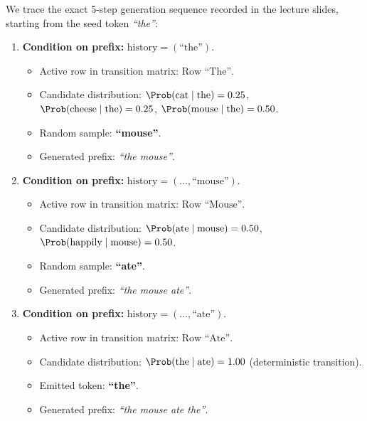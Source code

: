 \documentclass[../../main.tex]{subfiles}
\begin{document}
We trace the exact 5-step generation sequence recorded in the lecture slides, starting from the seed token \textit{``the''}:

\begin{enumerate}[label=\textbf{Step \arabic*:}, leftmargin=2.0cm]
    \item \textbf{Condition on prefix:} $\text{history} = (\text{``the''})$.
    \begin{itemize}
        \item Active row in transition matrix: $\text{Row ``The''}$.
        \item Candidate distribution: $\Prob(\text{cat}\mid\text{the}) = 0.25$, $\Prob(\text{cheese}\mid\text{the}) = 0.25$, $\Prob(\text{mouse}\mid\text{the}) = 0.50$.
        \item Random sample: \textbf{``mouse''}.
        \item Generated prefix: \textit{``the mouse''}.
    \end{itemize}

    \item \textbf{Condition on prefix:} $\text{history} = (\dots, \text{``mouse''})$.
    \begin{itemize}
        \item Active row in transition matrix: $\text{Row ``Mouse''}$.
        \item Candidate distribution: $\Prob(\text{ate}\mid\text{mouse}) = 0.50$, $\Prob(\text{happily}\mid\text{mouse}) = 0.50$.
        \item Random sample: \textbf{``ate''}.
        \item Generated prefix: \textit{``the mouse ate''}.
    \end{itemize}

    \item \textbf{Condition on prefix:} $\text{history} = (\dots, \text{``ate''})$.
    \begin{itemize}
        \item Active row in transition matrix: $\text{Row ``Ate''}$.
        \item Candidate distribution: $\Prob(\text{the}\mid\text{ate}) = 1.00$ (deterministic transition).
        \item Emitted token: \textbf{``the''}.
        \item Generated prefix: \textit{``the mouse ate the''}.
    \end{itemize}


\end{enumerate}
\end{document}

